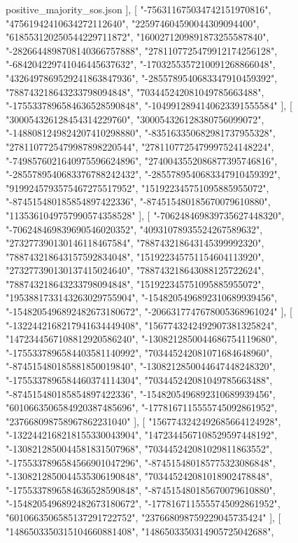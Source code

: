 \begin{filecontents*}[overwrite]{positive_majority_sos.json}
   ],
   [
    "-756311675034742151970816",
    "47561942410634272112640",
    "225974604590044309094400",
    "618553120250544229711872",
    "1600271209891873255587840",
    "-2826644898708140366757888",
    "2781107725479912174256128",
    "-684204229741046445637632",
    "-1703255357210091268866048",
    "4326497869529241863847936",
    "-2855789540683347910459392",
    "788743218643233798094848",
    "703445242081049785663488",
    "-1755337896584636528590848",
    "-1049912894140623391555584"
   ],
   [
    "300054326128454314229760",
    "300054326128380756099072",
    "-1488081249824207410298880",
    "-835163350682981737955328",
    "2781107725479987898220544",
    "2781107725479997524148224",
    "-7498576021640975596624896",
    "2740043552086877395746816",
    "-2855789540683376788242432",
    "-2855789540683347910459392",
    "9199245793575467275517952",
    "151922345751095885955072",
    "-874515480185854897422336",
    "-874515480185670079610880",
    "1135361049757990574358528"
   ],
   [
    "-706248469839735627448320",
    "-706248469839690546020352",
    "40931078935524267589632",
    "273277390130146118467584",
    "788743218643145399992320",
    "788743218643157592834048",
    "151922345751154604113920",
    "273277390130137415024640",
    "788743218643088125722624",
    "788743218643233798094848",
    "151922345751095885955072",
    "1953881733143263029755904",
    "-1548205496892310689939456",
    "-1548205496892482673180672",
    "-2066317747678005368961024"
   ],
   [
    "-1322442168217941634449408",
    "1567743242492907381325824",
    "1472344567108812920586240",
    "-1308212850044686754119680",
    "-1755337896584403581140992",
    "703445242081071684648960",
    "-874515480185881850019840",
    "-1308212850044647448248320",
    "-1755337896584460374114304",
    "703445242081049785663488",
    "-874515480185854897422336",
    "-1548205496892310689939456",
    "6010663506584920387485696",
    "-1778167115555745092861952",
    "237668098758967862231040"
   ],
   [
    "1567743242492685664124928",
    "-1322442168218155330043904",
    "1472344567108529597448192",
    "-1308212850044581831507968",
    "703445242081029811863552",
    "-1755337896584566901047296",
    "-874515480185775323086848",
    "-1308212850044535306190848",
    "703445242081018902478848",
    "-1755337896584636528590848",
    "-874515480185670079610880",
    "-1548205496892482673180672",
    "-1778167115555745092861952",
    "6010663506585137291722752",
    "237668098759229045735424"
   ],
   [
    "1486503350315104660881408",
    "1486503350314905725042688",

\end{filecontents*}
